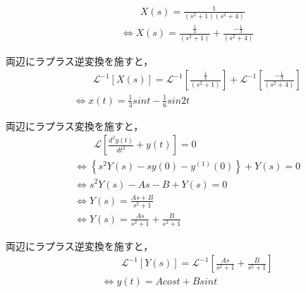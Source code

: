 \documentclass[a4paper,12pt]{article}
\begin{document}
\begin{tcolorbox}[title={ [12] (10) \( X(s)=\frac{ 1 }{ ( s^2 + 1 ) ( s^2 + 4 ) } \) }]
\vspace{-3mm}
\begin{align*}
    &\qquad X(s) =\frac{ 1 }{ ( s^2 + 1 ) ( s^2 + 4 ) } \\
    &\Leftrightarrow X(s) 
    = \frac{ \frac{1}{3} }{ ( s^2 + 1 ) }
    + \frac{ -\frac{1}{3} }{ ( s^2 + 4 ) }
\end{align*}

\quad 両辺にラプラス逆変換を施すと，
\vspace{-3mm}
\begin{align*}
    &\qquad \mathcal{L}^{-1} \left[ X(s) \right] 
    =\mathcal{L}^{-1} \left[ \frac{ \frac{1}{3} }{ ( s^2 + 1 ) } \right]
    +\mathcal{L}^{-1} \left[ \frac{- \frac{1}{3} }{ ( s^2 + 4 ) } \right] \\
    &\Leftrightarrow x(t) = \frac{1}{3}sin t -\frac{1}{6}sin 2t
\end{align*}

\end{tcolorbox}
\begin{tcolorbox}[title={[13] つぎの微分方程式をラプラス変換を用いて解け．\\
\[
\frac{d^2y(t)}{dt^2} + y(t) = 0
\]

\quad ただし，初期条件は，\(y(0)=A, y^{(1)}(0)=B\) とする． }]

\quad 両辺にラプラス変換を施すと，
\vspace{-3mm}
\begin{align*}
    &\qquad \mathcal{L}\left[ \frac{d^2y(t)}{dt^2} + y(t) \right] = 0 \\
    &\Leftrightarrow \left\{ s^2 Y(s) - sy(0) - y^{(1)}(0) \right\} + Y(s) = 0  \\
    &\Leftrightarrow s^2 Y(s) - A s - B + Y(s) = 0  \\
    &\Leftrightarrow Y(s) = \frac{As + B}{ s^2 + 1}  \\
    &\Leftrightarrow Y(s) = \frac{As}{ s^2 + 1} + \frac{B}{ s^2 + 1} 
\end{align*}
    
\quad 両辺にラプラス逆変換を施すと，
\vspace{-3mm}
\begin{align*}
&\qquad \mathcal{L}^{-1} \left[ Y(s) \right] 
= \mathcal{L}^{-1} \left[ \frac{As}{ s^2 + 1} + \frac{B}{ s^2 + 1}  \right] \\
&\Leftrightarrow y(t) = A cos{t} + B sin{t}
\end{align*}
\end{tcolorbox}
\end{document}
